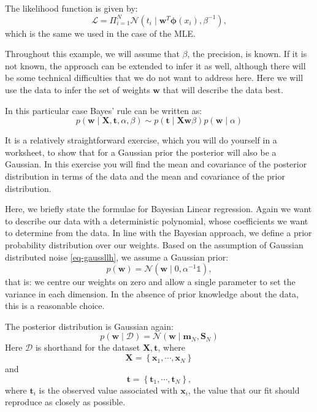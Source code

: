   The likelihood function is given by:
  \begin{equation}
    \mathcal{L} = \Pi^N_{i=1} \mathcal{N}(t_i \mid \boldsymbol{w}^T \boldsymbol{\phi}(x_i), \beta^{-1}),
  \end{equation}
  which is the same we used in the case of the MLE.
  
  Throughout this example, we will assume that $\beta$, the precision, is known. If it is not known, the approach can be extended
  to infer it as well, although  there will be some technical difficulties that we do not want to address here. Here we will
  use the data to infer the set of weights $\boldsymbol{w}$ that will describe the data best.

  In this particular case Bayes' rule can be written as:
  \begin{equation}
    p(\boldsymbol{w} \mid \boldsymbol{X}, \boldsymbol{t}, \alpha, \beta) \sim
    p(\boldsymbol{t} \mid \boldsymbol{X} \boldsymbol{w} \beta) p (\boldsymbol{w} \mid \alpha)
  \end{equation}

  
  
  It is a relatively straightforward exercise, which you will do yourself in a worksheet, to show
  that for a Gaussian prior the posterior will also be a Gaussian. In this exercise you will
  find the mean and covariance of the posterior distribution in terms of the data
  and the mean and covariance of the prior distribution. 


Here, we briefly state the formulae for Bayesian Linear regression. 
Again we want to describe our data with a deterministic polynomial, whose coefficients we want to determine from the data. In line with the
Bayesian approach, we define a prior probability distribution over our weights. Based on the assumption of Gaussian distributed noise \ref{eq-gaussllh}, we assume a Gaussian
prior:
$$
p(\boldsymbol{w}) = \mathcal{N}(\boldsymbol{w} \mid 0, \alpha^{-1}\mathbb{1}),
$$
that is: we centre our weights on zero and allow a single parameter to set the variance in each dimension.
In the absence of prior knowledge about the data, this is a reasonable choice.

The posterior distribution is Gaussian again:
$$
p(\boldsymbol{w} \mid \mathcal{D} ) = \mathcal{N}(\boldsymbol{w} \mid \boldsymbol{m}_N, \boldsymbol{S}_N)
$$
Here $\mathcal{D}$ is shorthand for the dataset $\boldsymbol{X}, \boldsymbol{t}$, where
$$
\boldsymbol{X} = \left\{ \boldsymbol{x}_1, \cdots, \boldsymbol{x}_N \right\} 
$$
and
$$
\boldsymbol{t} = \left\{ \boldsymbol{t}_1, \cdots, \boldsymbol{t}_N \right\},
$$
where $\boldsymbol{t}_i$ is the observed value associated with $\boldsymbol{x}_i$, the value that our fit should
reproduce as closely as possible.

